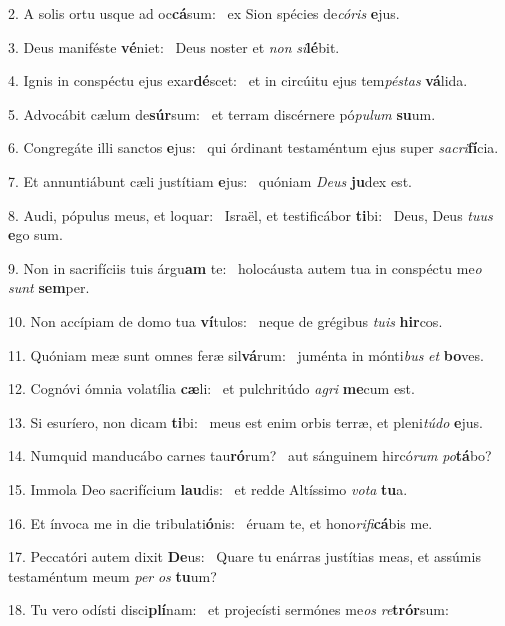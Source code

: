 2. A solis ortu usque ad oc\textbf{cá}sum: \ast\  ex Sion spécies de\textit{có}\textit{ris} \textbf{e}jus.\

3. Deus maniféste \textbf{vé}niet: \ast\  Deus noster et \textit{non} \textit{si}\textbf{lé}bit.\

4. Ignis in conspéctu ejus exar\textbf{dé}scet: \ast\  et in circúitu ejus tem\textit{pés}\textit{tas} \textbf{vá}lida.\

5. Advocábit cælum de\textbf{súr}sum: \ast\  et terram discérnere pó\textit{pu}\textit{lum} \textbf{su}um.\

6. Congregáte illi sanctos \textbf{e}jus: \ast\  qui órdinant testaméntum ejus super \textit{sa}\textit{cri}\textbf{fí}cia.\

7. Et annuntiábunt cæli justítiam \textbf{e}jus: \ast\  quóniam \textit{De}\textit{us} \textbf{ju}dex est.\

8. Audi, pópulus meus, et loquar: \dag\  Israël, et testificábor \textbf{ti}bi: \ast\  Deus, Deus \textit{tu}\textit{us} \textbf{e}go sum.\

9. Non in sacrifíciis tuis árgu\textbf{am} te: \ast\  holocáusta autem tua in conspéctu me\textit{o} \textit{sunt} \textbf{sem}per.\

10. Non accípiam de domo tua \textbf{ví}tulos: \ast\  neque de grégibus \textit{tu}\textit{is} \textbf{hir}cos.\

11. Quóniam meæ sunt omnes feræ sil\textbf{vá}rum: \ast\  juménta in mónti\textit{bus} \textit{et} \textbf{bo}ves.\

12. Cognóvi ómnia volatília \textbf{cæ}li: \ast\  et pulchritúdo \textit{a}\textit{gri} \textbf{me}cum est.\

13. Si esuríero, non dicam \textbf{ti}bi: \ast\  meus est enim orbis terræ, et pleni\textit{tú}\textit{do} \textbf{e}jus.\

14. Numquid manducábo carnes tau\textbf{ró}rum? \ast\  aut sánguinem hircó\textit{rum} \textit{po}\textbf{tá}bo?\

15. Immola Deo sacrifícium \textbf{lau}dis: \ast\  et redde Altíssimo \textit{vo}\textit{ta} \textbf{tu}a.\

16. Et ínvoca me in die tribulati\textbf{ó}nis: \ast\  éruam te, et hono\textit{ri}\textit{fi}\textbf{cá}bis me.\

17. Peccatóri autem dixit \textbf{De}us: \ast\  Quare tu enárras justítias meas, et assúmis testaméntum meum \textit{per} \textit{os} \textbf{tu}um?\

18. Tu vero odísti disci\textbf{plí}nam: \ast\  et projecísti sermónes me\textit{os} \textit{re}\textbf{trór}sum:\

